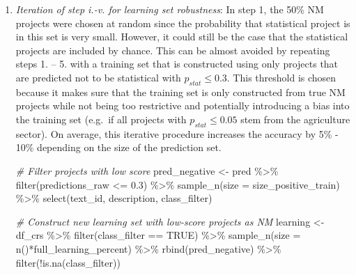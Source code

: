\documentclass[
]{article}
\newenvironment{Shaded}{\begin{snugshade}}{\end{snugshade}}
\newcommand{\AttributeTok}[1]{\textcolor[rgb]{0.77,0.63,0.00}{#1}}
\newcommand{\CommentTok}[1]{\textcolor[rgb]{0.56,0.35,0.01}{\textit{#1}}}
\newcommand{\ConstantTok}[1]{\textcolor[rgb]{0.00,0.00,0.00}{#1}}
\newcommand{\FloatTok}[1]{\textcolor[rgb]{0.00,0.00,0.81}{#1}}
\newcommand{\FunctionTok}[1]{\textcolor[rgb]{0.00,0.00,0.00}{#1}}
\newcommand{\NormalTok}[1]{#1}
\newcommand{\OtherTok}[1]{\textcolor[rgb]{0.56,0.35,0.01}{#1}}
\newcommand{\SpecialCharTok}[1]{\textcolor[rgb]{0.00,0.00,0.00}{#1}}
\begin{document}
\begin{enumerate}
\begin{enumerate}
\begin{Shaded}
\end{Shaded}
  \item
    \emph{Iteration of step i.-v. for learning set robustness}: In step 1, the 50\% NM projects were chosen at random since the probability that statistical project is in this set is very small. However, it could still be the case that the statistical projects are included by chance. This can be almost avoided by repeating steps 1. -- 5. with a training set that is constructed using only projects that are predicted not to be statistical with \(p_{stat} \leq 0.3\). This threshold is chosen because it makes sure that the training set is only constructed from true NM projects while not being too restrictive and potentially introducing a bias into the training set (e.g.~if all projects with \(p_{stat} \leq 0.05\) stem from the agriculture sector). On average, this iterative procedure increases the accuracy by 5\% - 10\% depending on the size of the prediction set.

\begin{Shaded}
\begin{Highlighting}[]
\CommentTok{\# Filter projects with low score }
\NormalTok{pred\_negative }\OtherTok{\textless{}{-}}\NormalTok{ pred }\SpecialCharTok{\%\textgreater{}\%} 
  \FunctionTok{filter}\NormalTok{(predictions\_raw }\SpecialCharTok{\textless{}=} \FloatTok{0.3}\NormalTok{) }\SpecialCharTok{\%\textgreater{}\%}
  \FunctionTok{sample\_n}\NormalTok{(}\AttributeTok{size =}\NormalTok{ size\_positive\_train) }\SpecialCharTok{\%\textgreater{}\%} 
  \FunctionTok{select}\NormalTok{(text\_id, description, class\_filter) }

\CommentTok{\# Construct new learning set with low{-}score projects as NM}
\NormalTok{learning }\OtherTok{\textless{}{-}}\NormalTok{ df\_crs }\SpecialCharTok{\%\textgreater{}\%}
  \FunctionTok{filter}\NormalTok{(class\_filter }\SpecialCharTok{==} \ConstantTok{TRUE}\NormalTok{) }\SpecialCharTok{\%\textgreater{}\%}
  \FunctionTok{sample\_n}\NormalTok{(}\AttributeTok{size =} \FunctionTok{n}\NormalTok{()}\SpecialCharTok{*}\NormalTok{full\_learning\_percent) }\SpecialCharTok{\%\textgreater{}\%}
  \FunctionTok{rbind}\NormalTok{(pred\_negative) }\SpecialCharTok{\%\textgreater{}\%}
  \FunctionTok{filter}\NormalTok{(}\SpecialCharTok{!}\FunctionTok{is.na}\NormalTok{(class\_filter))}


\end{Highlighting}
\end{Shaded}
\end{enumerate}
\end{enumerate}
\end{document}
